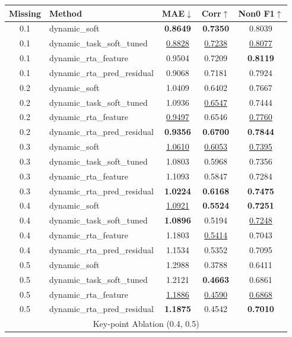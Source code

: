\begin{table}[t]
\centering
\small
\begin{tabular}{c l c c c}
\toprule
Missing & Method & MAE$\downarrow$ & Corr$\uparrow$ & Non0 F1$\uparrow$ \\ 
\midrule
0.1 & dynamic_soft & \textbf{0.8649} & \textbf{0.7350} & 0.8039 \\ 
0.1 & dynamic_task_soft_tuned & \underline{0.8828} & \underline{0.7238} & \underline{0.8077} \\ 
0.1 & dynamic_rta_feature & 0.9504 & 0.7209 & \textbf{0.8119} \\ 
0.1 & dynamic_rta_pred_residual & 0.9068 & 0.7181 & 0.7924 \\ 
0.2 & dynamic_soft & 1.0409 & 0.6402 & 0.7667 \\ 
0.2 & dynamic_task_soft_tuned & 1.0936 & \underline{0.6547} & 0.7444 \\ 
0.2 & dynamic_rta_feature & \underline{0.9497} & 0.6546 & \underline{0.7760} \\ 
0.2 & dynamic_rta_pred_residual & \textbf{0.9356} & \textbf{0.6700} & \textbf{0.7844} \\ 
0.3 & dynamic_soft & \underline{1.0610} & \underline{0.6053} & \underline{0.7395} \\ 
0.3 & dynamic_task_soft_tuned & 1.0803 & 0.5968 & 0.7356 \\ 
0.3 & dynamic_rta_feature & 1.1093 & 0.5847 & 0.7284 \\ 
0.3 & dynamic_rta_pred_residual & \textbf{1.0224} & \textbf{0.6168} & \textbf{0.7475} \\ 
0.4 & dynamic_soft & \underline{1.0921} & \textbf{0.5524} & \textbf{0.7251} \\ 
0.4 & dynamic_task_soft_tuned & \textbf{1.0896} & 0.5194 & \underline{0.7248} \\ 
0.4 & dynamic_rta_feature & 1.1803 & \underline{0.5414} & 0.7043 \\ 
0.4 & dynamic_rta_pred_residual & 1.1534 & 0.5352 & 0.7095 \\ 
0.5 & dynamic_soft & 1.2988 & 0.3788 & 0.6411 \\ 
0.5 & dynamic_task_soft_tuned & 1.2121 & \textbf{0.4663} & 0.6861 \\ 
0.5 & dynamic_rta_feature & \underline{1.1886} & \underline{0.4590} & \underline{0.6868} \\ 
0.5 & dynamic_rta_pred_residual & \textbf{1.1875} & 0.4542 & \textbf{0.7010} \\ 
\midrule
\multicolumn{5}{c}{Key-point Ablation (0.4, 0.5)} \\ 

\end{tabular}
\end{table}
